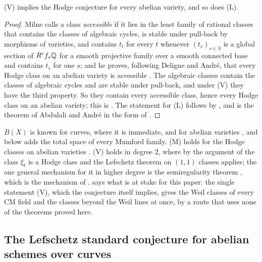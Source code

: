 \begin{theorem}\label{thm:vhcab}
\textup{(V)} implies the Hodge conjecture for every abelian variety, and so
does \textup{(L)}.
\end{theorem}

\begin{proof}
Milne calls a class \emph{accessible} if it lies in the least family of
rational classes that contains the classes of algebraic cycles, is stable
under pull-back by morphisms of varieties, and contains $t_{t}$ for every $t$
whenever $(t_{s})_{s\in S}$ is a global section of $R^{r}f_{*}\mathbb{Q}$ for a
smooth projective family over a smooth connected base and contains $t_{s}$
for one $s$; and he proves, following Deligne and Andr\'e, that every Hodge
class on an abelian variety is accessible \cite[\S5.1, Theorem~3]{Mil20}.
The algebraic classes contain the classes of algebraic cycles and are stable
under pull-back, and under \textup{(V)} they have the third property. So they
contain every accessible class, hence every Hodge class on an abelian
variety; this is \cite[Remark~2]{Mil20}. The statement for \textup{(L)}
follows by , and is the theorem of Abdulali and Andr\'e in
the form of \cite[Theorem~4]{Mil20}.
\end{proof}

\begin{remark}\label{rem:lmvknown}
$B(X)$ is known for curves, where it is immediate,
and for abelian varieties \cite[\S2]{Kle68}, and 
below adds the total space of every Mumford family. \textup{(M)} holds for the Hodge
classes on abelian varieties \cite[Th\'eor\`eme~0.6.2]{And96b}.
\textup{(V)} holds in degree $2$, where by the argument of
 the class $\xi_{t}$ is a Hodge class and the Lefschetz
theorem on $(1,1)$ classes applies; the one general mechanism for it in
higher degree is the semiregularity theorem \cite{Blo72,BF03,Pri24}, which is the
mechanism of .  says what is at
stake for this paper: the single statement \textup{(V)}, which the conjecture
itself implies, gives the Weil classes of every CM field and the classes
beyond the Weil lines at once, by a route that uses none of the theorems
proved here.
\end{remark}

\subsection{The Lefschetz standard conjecture for abelian schemes over curves}
\label{ssec:newlefschetz}

